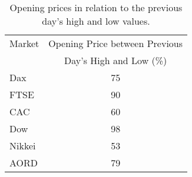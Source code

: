 \begin{table}[!htbp] \centering 
  \caption[Opening Prices in relation to previous day's HL.]{Opening prices in relation to the previous day's high and low values.} 
  \label{tab:openprices}
\begin{tabular}{lc} 
\toprule 
Market & Opening Price between Previous   \\ 
       &  Day's High and Low (\%) \\
\midrule 
Dax & 75 \\ 
FTSE & 90  \\ 
CAC & 60  \\ 
Dow & 98 \\ 
Nikkei & 53 \\ 
AORD & 79\\ 
\bottomrule 
\end{tabular} 
\end{table} 


